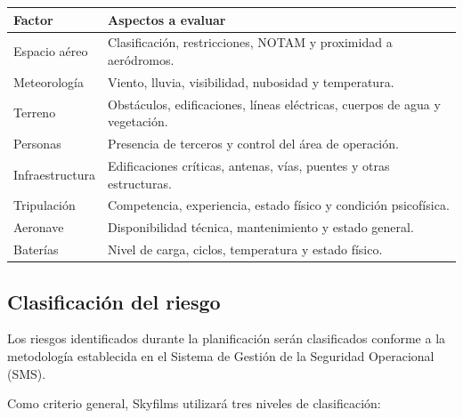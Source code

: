 \begin{longtable}{|p{5cm}|p{9cm}|}

\hline

\textbf{Factor} &
\textbf{Aspectos a evaluar}

\\ \hline

Espacio aéreo &
Clasificación, restricciones, NOTAM y proximidad a aeródromos.

\\ \hline

Meteorología &
Viento, lluvia, visibilidad, nubosidad y temperatura.

\\ \hline

Terreno &
Obstáculos, edificaciones, líneas eléctricas, cuerpos de agua y vegetación.

\\ \hline

Personas &
Presencia de terceros y control del área de operación.

\\ \hline

Infraestructura &
Edificaciones críticas, antenas, vías, puentes y otras estructuras.

\\ \hline

Tripulación &
Competencia, experiencia, estado físico y condición psicofísica.

\\ \hline

Aeronave &
Disponibilidad técnica, mantenimiento y estado general.

\\ \hline

Baterías &
Nivel de carga, ciclos, temperatura y estado físico.

\\ \hline

\end{longtable}

\subsection{Clasificación del riesgo}

Los riesgos identificados durante la planificación serán clasificados conforme a la metodología establecida en el Sistema de Gestión de la Seguridad Operacional (SMS).

Como criterio general, Skyfilms utilizará tres niveles de clasificación:

